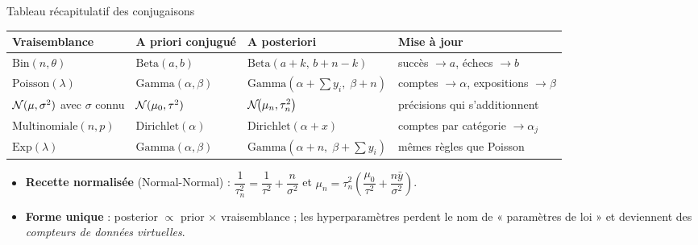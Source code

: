 \begin{frame}{Tableau récapitulatif des conjugaisons}
\centering
\renewcommand{\arraystretch}{1.25}
\begin{tabular}{@{}p{3.3cm}p{3.2cm}p{2.9cm}p{3.3cm}@{}}
\toprule
\textbf{Vraisemblance} & \textbf{A priori conjugué} & \textbf{A posteriori} &
\textbf{Mise à jour} \\
\midrule
$\mathrm{Bin}(n,\theta)$ & $\mathrm{Beta}(a,b)$ &
$\mathrm{Beta}(a+k,\,b+n-k)$ & succès $\to a$, échecs $\to b$ \\[1mm]
$\mathrm{Poisson}(\lambda)$ & $\mathrm{Gamma}(\alpha,\beta)$ &
$\mathrm{Gamma}(\alpha + \sum y_i,\;\beta + n)$ & comptes $\to \alpha$,
expositions $\to \beta$ \\[1mm]
$\mathcal{N}(\mu, \sigma^2)$ avec $\sigma$ connu & $\mathcal{N}(\mu_0, \tau^2)$ &
$\mathcal{N}\!\big(\mu_n, \tau_n^2\big)$ & précisions qui s'additionnent \\[1mm]
$\mathrm{Multinomiale}(n, p)$ & $\mathrm{Dirichlet}(\alpha)$ &
$\mathrm{Dirichlet}(\alpha + x)$ & comptes par catégorie $\to \alpha_j$ \\[1mm]
$\mathrm{Exp}(\lambda)$ & $\mathrm{Gamma}(\alpha, \beta)$ &
$\mathrm{Gamma}(\alpha + n,\;\beta + \sum y_i)$ & mêmes règles que Poisson \\[1mm]
\bottomrule
\end{tabular}
\vspace{2mm}
\begin{itemize}
  \item[$\blacktriangleright$] \textbf{Recette normalisée} (Normal-Normal) :
        $\dfrac{1}{\tau_n^2} = \dfrac{1}{\tau^2} + \dfrac{n}{\sigma^2}$ \quad et \quad
        $\mu_n = \tau_n^2\!\left(\dfrac{\mu_0}{\tau^2} + \dfrac{n \bar y}{\sigma^2}\right)$.
  \item[$\blacktriangleright$] \textbf{Forme unique} : posterior $\propto$ prior $\times$
        vraisemblance ; les hyperparamètres perdent le nom de « paramètres de loi »
        et deviennent des \emph{compteurs de données virtuelles}.
\end{itemize}
\end{frame}

